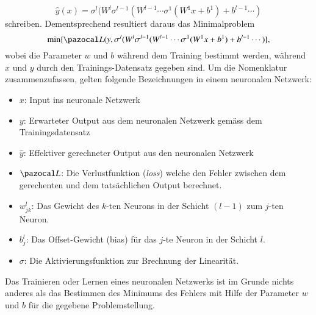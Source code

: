 \begin{equation}
\hat{y}(x) = \sigma^{l}(W^{l}\sigma^{l-1}(W^{l-1}\cdots \sigma^{1}(W^{1}x+b^{1}) + b^{l-1} \cdots )
\label{ableitung:eqn:full_net}
\end{equation}
schreiben. Dementsprechend resultiert daraus das Minimalproblem
\begin{equation}
	\min \{ \Lb(y, \sigma^{l}(W^{l}\sigma^{l-1}(W^{l-1}\cdots \sigma^{1}(W^{1}x+b^{1}) + b^{l-1} \cdots ) \} \text{,}
\end{equation}
wobei die Parameter $w$ und $b$ während dem Training bestimmt werden, während $x$ und $y$ durch den Trainings-Datensatz gegeben sind.
Um die Nomenklatur zusammenzufassen, gelten folgende Bezeichnungen in einem neuronalen Netzwerk: 
\begin{itemize}
	\item{$x$: Input ins neuronale Netzwerk}
	\item{$y$: Erwarteter Output aus dem neuronalen Netzwerk gemäss dem Trainingsdatensatz}
	\item{$\hat{y}$: Effektiver gerechneter Output aus den neuronalen Netzwerk}
	\item{$\Lb$: Die Verlustfunktion (\textit{loss}) welche den Fehler zwischen dem gerechenten und dem tatsächlichen Output berechnet.}
	\item{$w_{jk}^{l}$: Das Gewicht des $k$-ten Neurons in der Schicht $(l-1)$ zum $j$-ten Neuron.}
	\item{$b_{j}^{l}$: Das Offset-Gewicht (bias) für das $j$-te Neuron in der Schicht $l$.}
	\item{$\sigma$: Die Aktivierungsfunktion zur Brechnung der Linearität.}
\end{itemize}
Das Trainieren oder Lernen eines neuronalen Netzwerks ist im Grunde
nichts anderes als das Bestimmen des Minimums des Fehlers mit Hilfe
der Parameter $w$ und $b$ für die gegebene Problemstellung.
%
%
